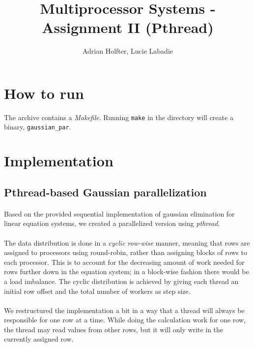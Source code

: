\documentclass[]{article}
\title{Multiprocessor Systems - Assignment II (Pthread)}
\author{Adrian Holfter, Lucie Labadie}
\begin{document}
\maketitle

\section{How to run}

\paragraph{} The archive contains a \emph{Makefile}. Running \texttt{make} in the directory will create a binary, \texttt{gaussian\_par}.

\section{Implementation}

\subsection{Pthread-based Gaussian parallelization}

\paragraph{} Based on the provided sequential implementation of gaussian elimination for linear equation systems, we created a parallelized version using \emph{pthread}.

\paragraph{} The data distribution is done in a \emph{cyclic row-wise} manner, meaning that rows are assigned to processors using round-robin, rather than assigning blocks of rows to each processor. This is to account for the decreasing amount of work needed for rows further down in the equation system; in a block-wise fashion there would be a load imbalance. The cyclic distribution is achieved by giving each thread an initial row offset and the total number of workers as step size.

\paragraph{} We restructured the implementation a bit in a way that a thread will always be responsible for one row at a time. While doing the calculation work for one row, the thread may read values from other rows, but it will only write in the currently assigned row.
\end{document}
